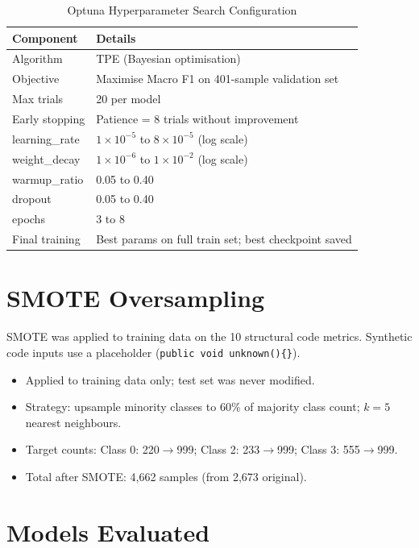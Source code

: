 \documentclass[12pt, a4paper]{report}
\begin{document}
\begin{table}[h!]
\centering
\caption{Optuna Hyperparameter Search Configuration}
\label{tab:optuna}
\begin{tabular}{L{4cm} L{8cm}}
\toprule
\textbf{Component} & \textbf{Details} \\
\midrule
Algorithm       & TPE (Bayesian optimisation) \\
Objective       & Maximise Macro F1 on 401-sample validation set \\
Max trials      & 20 per model \\
Early stopping  & Patience = 8 trials without improvement \\
learning\_rate  & $1\times10^{-5}$ to $8\times10^{-5}$ (log scale) \\
weight\_decay   & $1\times10^{-6}$ to $1\times10^{-2}$ (log scale) \\
warmup\_ratio   & 0.05 to 0.40 \\
dropout         & 0.05 to 0.40 \\
epochs          & 3 to 8 \\
Final training  & Best params on full train set; best checkpoint saved \\
\bottomrule
\end{tabular}
\end{table}

\section{SMOTE Oversampling}

SMOTE was applied to training data on the 10 structural code metrics. Synthetic code inputs use a placeholder (\texttt{public void unknown()\{\}}).

\begin{itemize}
  \item Applied to training data only; test set was never modified.
  \item Strategy: upsample minority classes to 60\% of majority class count; $k=5$ nearest neighbours.
  \item Target counts: Class 0: 220$\to$999; Class 2: 233$\to$999; Class 3: 555$\to$999.
  \item Total after SMOTE: 4,662 samples (from 2,673 original).
\end{itemize}

\section{Models Evaluated}
\end{document}
